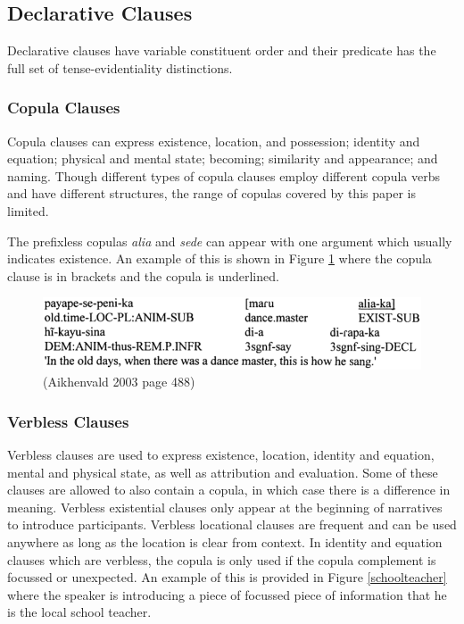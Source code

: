 \documentclass{article}
\begin{document}
\subsection{Declarative Clauses} \label{Declarative Clauses}
Declarative clauses have variable constituent order and their predicate has the full set of tense-evidentiality distinctions. %

\subsubsection{Copula Clauses} \label{Copula}
Copula clauses can express existence, location, and possession; identity and equation; physical and mental state; becoming; similarity and appearance; and naming. Though different types of copula clauses employ different copula verbs and have different structures, the range of copulas covered by this paper is limited. %

The prefixless copulas \textit{alia} and \textit{sede} can appear with one argument which usually indicates existence. An example of this is shown in Figure \ref*{dancemaster} where the copula clause is in brackets and the copula is underlined.

\begin{figure}[h!]
\centering
\includegraphics[scale = 0.4]{dancemaster.png}
	\caption{(Aikhenvald 2003 page 488)}
	\label{dancemaster}
\end{figure}

\subsubsection{Verbless Clauses}
Verbless clauses are used to express existence, location, identity and equation, mental and physical state, as well as attribution and evaluation. Some of these clauses are allowed to also contain a copula, in which case there is a difference in meaning. Verbless existential clauses only appear at the beginning of narratives to introduce participants. Verbless locational clauses are frequent and can be used anywhere as long as the location is clear from context. In identity and equation clauses which are verbless, the copula is only used if the copula complement is focussed or unexpected. An example of this is provided in Figure \ref*{schoolteacher} where the speaker is introducing a piece of focussed piece of information that he is the local school teacher.
\end{document}
